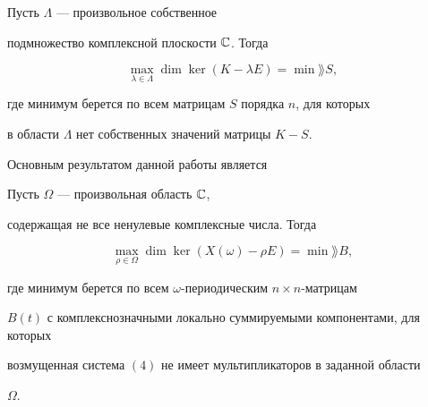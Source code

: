 \begin{lem} Пусть $\Lambda$ --- произвольное собственное


подмножество комплексной плоскости $\Bbb C$. Тогда


\begin{equation}


\max_{\lambda\in\Lambda}\dim\ker(K-\lambda E)=\min\rang S,


\end{equation}


где минимум берется по всем матрицам $S$ порядка $n$, для которых


в области $\Lambda$ нет собственных значений матрицы $K-S$.


\end{lem}





Основным результатом данной работы является





\begin{thmnonum} Пусть $\Omega$ --- произвольная область $\Bbb C$,


содержащая не все ненулевые комплексные числа. Тогда


$$


\max_{\rho\in\Omega}\dim\ker(X(\omega)-\rho E)=\min\rang B,


$$


где минимум берется по всем $\omega$-периодическим $n\times n$-матрицам


$B(t)$ с комплекснозначными локально суммируемыми компонентами, для которых


возмущенная система $(4)$ не имеет мультипликаторов в заданной области


$\Omega$.


\end{thmnonum}





